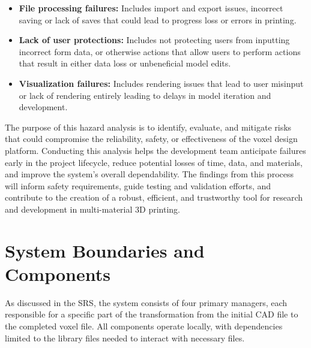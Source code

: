 \documentclass{article}
\begin{document}
\begin{itemize}
    \item \textbf{File processing failures:} Includes import and export issues, incorrect saving or lack of saves that could lead to progress loss or errors in printing.
    \item \textbf{Lack of user protections:} Includes not protecting users from inputting incorrect form data, or otherwise actions that allow users to perform actions that result in either data loss or unbeneficial model edits.
    \item \textbf{Visualization failures:} Includes rendering issues that lead to user misinput or lack of rendering entirely leading to delays in model iteration and development.
\end{itemize}

\noindent The purpose of this hazard analysis is to identify, evaluate, and mitigate risks that could compromise the reliability, 
safety, or effectiveness of the voxel design platform. Conducting this analysis helps the development team anticipate 
failures early in the project lifecycle, reduce potential losses of time, data, and materials, and improve the system’s 
overall dependability. The findings from this process will inform safety requirements, guide testing and validation efforts, 
and contribute to the creation of a robust, efficient, and trustworthy tool for research and development in multi-material 
3D printing.

\section{System Boundaries and Components}

As discussed in the SRS, the system consists of four primary managers, each responsible
for a specific part of the transformation from the initial CAD file to the completed 
voxel file. All components operate locally, with dependencies limited to
the library files needed to interact with necessary files.
\end{document}
